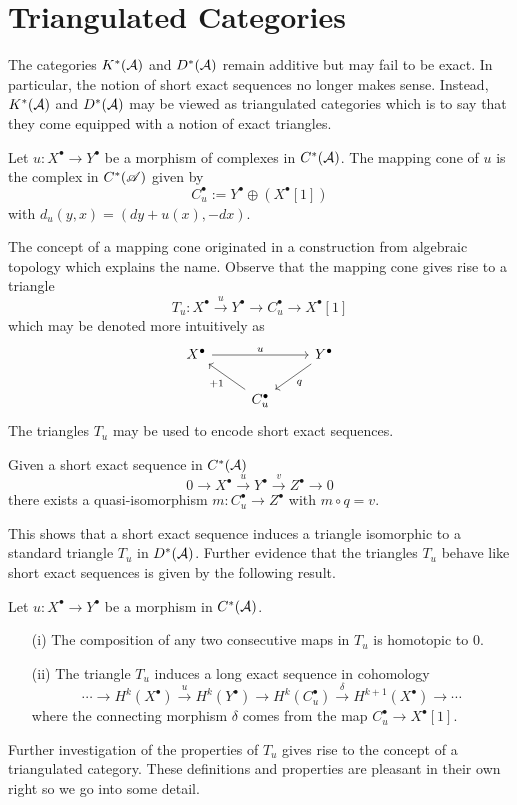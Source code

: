 \section{Triangulated Categories}
The categories $K^*(\AA)$ and $D^*(\AA)$ remain additive but may fail to be exact.
In particular, the notion of short exact sequences no longer makes sense.
Instead, $K^*(\AA)$ and $D^*(\AA)$ may be viewed as triangulated categories which is to say that they come equipped with a notion of exact triangles.
\begin{definition}
 Let $u:X^\bullet \to Y^\bullet$ be a morphism of complexes in $C^*(\AA)$.
 The mapping cone of $u$ is the complex in $C^*(\A)$ given by
 $$C_u^\bullet := Y^\bullet \oplus (X^\bullet[1]) $$
 with $d_u(y,x)= (dy + u(x) , -dx)$.
\end{definition}
The concept of a mapping cone originated in a construction from algebraic topology which explains the name.
Observe that the mapping cone gives rise to a triangle
$$T_u:X^\bullet \xrightarrow{u} Y^\bullet \to C_u^\bullet \to X^\bullet[1]$$
which may be denoted more intuitively as
$$
 \begin{tikzcd}
   X^\bullet \arrow{rr}{u}& & Y^\bullet \arrow{dl}{q}\\
   & C_u^\bullet\arrow{lu}{+1}
 \end{tikzcd}
$$
The triangles $T_u$ may be used to encode short exact sequences.
\begin{proposition}\label{prop: SESYieldsTriangle}
Given a short exact sequence in $C^*(\AA)$
$$0 \to X^\bullet \xrightarrow{u} Y^\bullet \xrightarrow{v} Z^\bullet \to 0 $$
there exists a quasi-isomorphism $m:C_u^\bullet \to Z^\bullet$ with $m\circ q = v$.
\end{proposition}
This shows that a short exact sequence induces a triangle isomorphic to a standard triangle $T_u$ in $D^*(\AA)$.
Further evidence that the triangles $T_u$ behave like short exact sequences is given by the following result.
\begin{proposition}
 Let $u:X^\bullet \to Y^\bullet$ be a morphism in $C^*(\AA)$.
 \begin{enumerate}
   \item[(i)] The composition of any two consecutive maps in $T_u$ is homotopic to $0$.
   \item[(ii)] The triangle $T_u$ induces a long exact sequence in cohomology
   $$\cdots \to H^k(X^\bullet) \xrightarrow{u} H^k(Y^\bullet) \to H^k(C_u^\bullet) \xrightarrow{\delta} H^{k+1}(X^\bullet) \to \cdots$$
   where the connecting morphism $\delta$ comes from the map $C_u^\bullet \to X^\bullet[1]$.
 \end{enumerate}
\end{proposition}
Further investigation of the properties of $T_u$ gives rise to the concept of a triangulated category.
These definitions and properties are pleasant in their own right so we go into some detail.

